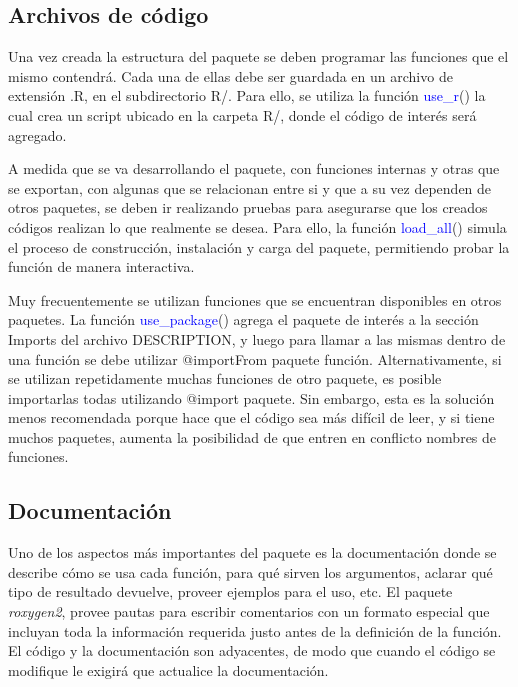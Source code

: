 \subsection{Archivos de código}

Una vez creada la estructura del paquete se deben programar las funciones que el mismo contendrá. Cada una de ellas debe ser guardada en un archivo de extensión .R, en el subdirectorio R/. Para ello, se utiliza la función \textcolor{blue}{use\_r}() la cual crea un script ubicado en la carpeta R/, donde el código de interés será agregado. 

A medida que se va desarrollando el paquete, con funciones internas y otras que se exportan, con algunas que se relacionan entre si y que a su vez dependen de otros paquetes, se deben ir realizando pruebas para asegurarse que los creados códigos realizan lo que realmente se desea. Para ello, la función \textcolor{blue}{load\_all}() simula el proceso de construcción, instalación y carga del paquete, permitiendo probar la función de manera interactiva.

Muy frecuentemente se utilizan funciones que se encuentran disponibles en otros paquetes. La función \textcolor{blue}{use\_package}() agrega el paquete de interés a la sección Imports del archivo DESCRIPTION, y luego para llamar a las mismas dentro de una función se debe utilizar @importFrom paquete función. Alternativamente, si se utilizan repetidamente muchas funciones de otro paquete, es posible importarlas todas utilizando @import paquete. Sin embargo, esta es la solución menos recomendada porque hace que el código sea más difícil de leer, y si tiene muchos paquetes, aumenta la posibilidad de que entren en conflicto nombres de funciones.


\subsection{Documentación}

Uno de los aspectos más importantes del paquete es la documentación donde se describe cómo se usa cada función, para qué sirven los argumentos, aclarar qué tipo de resultado devuelve, proveer ejemplos para el uso, etc. El paquete \emph{roxygen2}, provee pautas para escribir comentarios con un formato especial que incluyan toda la información requerida justo antes de la definición de la función. El código y la documentación son adyacentes, de modo que cuando el código se modifique le exigirá que actualice la documentación. 

